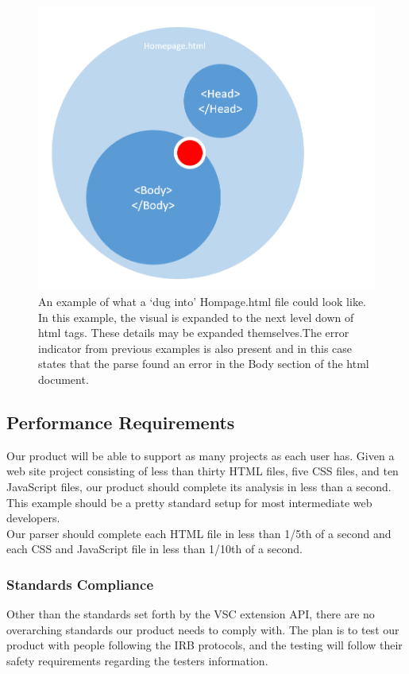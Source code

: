 \documentclass[letterpaper,10pt,titlepage,draftclsnofoot,onecolumn,onesided] {IEEEtran}
\begin{document}
\begin{figure}
\includegraphics[scale=0.25]{digdown.png}
\caption{An example of what a `dug into' Hompage.html file could look like. In this example, the visual is expanded to the next level down of html tags. These details may be expanded themselves.The error indicator from previous examples is also present and in this case states that the parse found an error in the Body section of the html document.}
\end{figure}

\subsection{Performance Requirements}
Our product will be able to support as many projects as each user has. 
Given a web site project consisting of less than thirty HTML files, five CSS files, and ten JavaScript files, our product should complete its analysis in less than a second. 
This example should be a pretty standard setup for most intermediate web developers.
\\
Our parser should complete each HTML file in less than 1/5th of a second and each CSS and JavaScript file in less than 1/10th of a second.

\subsubsection{Standards Compliance}
Other than the standards set forth by the VSC extension API, there are no overarching standards our product needs to comply with.
The plan is to test our product with people following the IRB protocols, and the testing will follow their safety requirements regarding the testers information.
\end{document}
